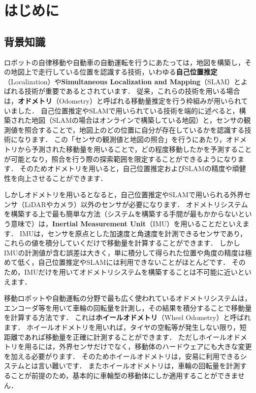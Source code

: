 \chapter{はじめに}

\section{背景知識}

ロボットの自律移動や自動車の自動運転を行うにあたっては，地図を構築し，その地図上で走行している位置を認識する技術，いわゆる{\bf 自己位置推定}（Localization）や{\bf Simultaneous Localization and Mapping}（SLAM）とよばれる技術が重要であるとされています\cite{Thrun:2005:PR:1121596}．
従来，これらの技術を用いる場合は，{\bf オドメトリ}（Odometry）と呼ばれる移動量推定を行う枠組みが用いられていました．
自己位置推定やSLAMで用いられている技術を端的に述べると，構築された地図（SLAMの場合はオンラインで構築している地図）と，センサの観測値を照合することで，地図上のどの位置に自分が存在しているかを認識する技術になります．
この「センサの観測値と地図の照合」を行うにあたり，オドメトリから予測された移動量を用いることで，どの程度移動したかを予測することが可能となり，照合を行う際の探索範囲を限定することができるようになります．
そのためオドメトリを用いると，自己位置推定およびSLAMの精度や頑健性を向上させることができます．

しかしオドメトリを用いるとなると，自己位置推定やSLAMで用いられる外界センサ（LiDARやカメラ）以外のセンサが必要になります\cite{BorensteinJRS1997}．
オドメトリシステムを構築する上で最も簡単な方法（システムを構築する手間が最もかからないという意味で）は，{\bf Inertial Measurement Unit}（IMU）を用いることだといえます．
IMUは，センサを原点とした加速度と角速度を計測できるセンサであり，これらの値を積分していくだけで移動量を計算することができます．
しかしIMUの計測値が含む誤差は大きく，単に積分して得られた位置や角度の精度は極めて低く，自己位置推定やSLAMには利用できないことがほとんどです．
そのため，IMUだけを用いてオドメトリシステムを構築することは不可能に近いといえます．

移動ロボットや自動運転の分野で最も広く使われているオドメトリシステムは，エンコーダ等を用いて車輪の回転量を計測し，その結果を積分することで移動量を計算する方法です．
これは{\bf ホイールオドメトリ}（Wheel Odometry）と呼ばれます．
ホイールオドメトリを用いれば，タイヤの空転等が発生しない限り，短距離であれば移動量を正確に計測することができます．
ただしホイールオドメトリを用るには，外界センサだけでなく，移動体のハードウェアにも大きな変更を加える必要がります．
そのためホイールオドメトリは，安易に利用できるシステムとは言い難いです．
またホイールオドメトリは，車輪の回転量を計測することが前提のため，基本的に車輪型の移動体にしか適用することができません．

